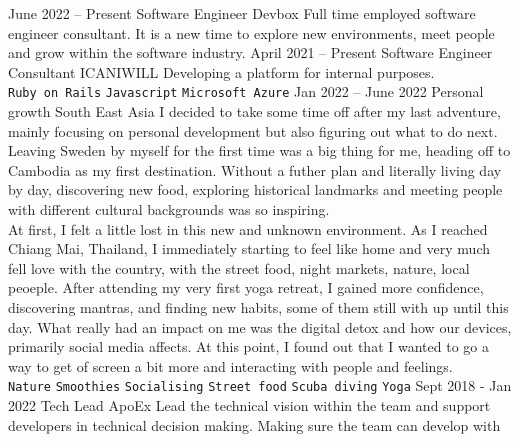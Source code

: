 \documentclass[9pt]{template} %
\begin{document}
\begin{entrylist}
  \entry
    {June 2022 -- Present}
    {Software Engineer}
    {Devbox}
    {Full time employed software engineer consultant. It is a new time to
      explore new environments, meet people and grow within the software
      industry.
      }
  \entry
    {April 2021 -- Present}
    {Software Engineer Consultant}
    {ICANIWILL}
    {Developing a platform for internal purposes.\\
      \texttt{Ruby on Rails}\slashsep
      \texttt{Javascript}\slashsep
      \texttt{Microsoft Azure}
    }
  \entry
    {Jan 2022 -- June 2022}
    {Personal growth}
    {South East Asia}
    {I decided to take some time off after my last adventure, mainly focusing on
      personal development but also figuring out what to do next. Leaving Sweden
      by myself for the first time was a big thing for me, heading off to
      Cambodia as my first destination. Without a futher plan and literally
      living day by day, discovering new food, exploring historical landmarks
      and meeting people with different cultural backgrounds was so inspiring.\\
      At first, I felt a little lost in this new and unknown environment. As I
      reached Chiang Mai, Thailand, I immediately starting to feel like home and
      very much fell love with the country, with the street food, night markets,
      nature, local peoeple. After attending my very first yoga retreat, I
      gained more confidence, discovering mantras, and finding new habits, some
      of them still with up until this day. What really had an impact on me was
      the digital detox and how our devices, primarily social media affects.
      At this point, I found out that I wanted to go a way to get of screen a
      bit more and interacting with people and feelings.\\
      \texttt{Nature}\slashsep
      \texttt{Smoothies}\slashsep
      \texttt{Socialising}\slashsep
      \texttt{Street food}\slashsep
      \texttt{Scuba diving}\slashsep
      \texttt{Yoga}
    }
  \entry
    {Sept 2018 - Jan 2022}
    {Tech Lead}
    {ApoEx}
    {Lead the technical vision within the team and support developers in
      technical decision making. Making sure the team can develop with
}
\end{entrylist}
\end{document}

